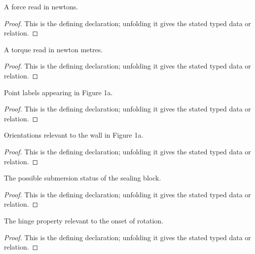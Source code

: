 \begin{definition}[ForceSI]
  \label{decl:physics:IPhO_2026_1_A_1:ForceSI}
  A force read in newtons.
\end{definition}
\begin{proof}
  This is the defining declaration; unfolding it gives the stated typed data or relation.
\end{proof}

\begin{definition}[TorqueSI]
  \label{decl:physics:IPhO_2026_1_A_1:TorqueSI}
  A torque read in newton metres.
\end{definition}
\begin{proof}
  This is the defining declaration; unfolding it gives the stated typed data or relation.
\end{proof}

\begin{definition}[FigurePointLabel]
  \label{decl:physics:IPhO_2026_1_A_1:FigurePointLabel}
  Point labels appearing in Figure 1a.
\end{definition}
\begin{proof}
  This is the defining declaration; unfolding it gives the stated typed data or relation.
\end{proof}

\begin{definition}[WallOrientation]
  \label{decl:physics:IPhO_2026_1_A_1:WallOrientation}
  Orientations relevant to the wall in Figure 1a.
\end{definition}
\begin{proof}
  This is the defining declaration; unfolding it gives the stated typed data or relation.
\end{proof}

\begin{definition}[SubmersionStatus]
  \label{decl:physics:IPhO_2026_1_A_1:SubmersionStatus}
  The possible submersion status of the sealing block.
\end{definition}
\begin{proof}
  This is the defining declaration; unfolding it gives the stated typed data or relation.
\end{proof}

\begin{definition}[HingeFriction]
  \label{decl:physics:IPhO_2026_1_A_1:HingeFriction}
  The hinge property relevant to the onset of rotation.
\end{definition}
\begin{proof}
  This is the defining declaration; unfolding it gives the stated typed data or relation.
\end{proof}

